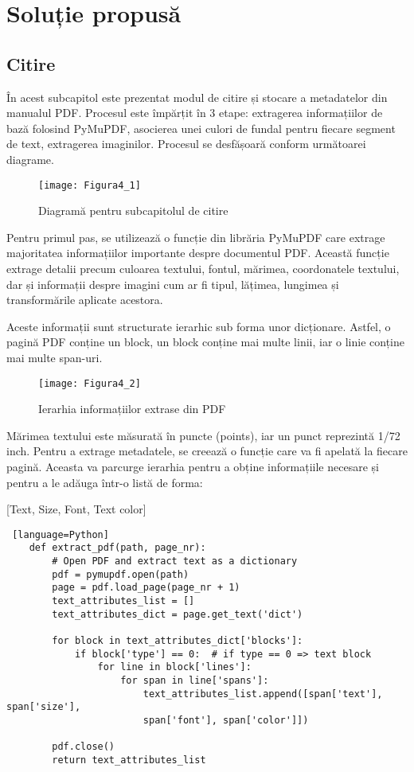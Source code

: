 \chapter{Soluție propusă}
\section{Citire}

În acest subcapitol este prezentat modul de citire și stocare a metadatelor din manualul PDF. Procesul este împărțit în 3 etape: extragerea informațiilor de bază folosind PyMuPDF, asocierea unei culori de fundal pentru fiecare segment de text, extragerea imaginilor. Procesul se desfășoară conform următoarei diagrame.
\begin{figure}[H]
	\centering
	\texttt{[image: Figura4\_1]}
	\caption{Diagramă pentru subcapitolul de citire}
	\label{fig:Figura4_1}
\end{figure}

Pentru primul pas, se utilizează o funcție din librăria PyMuPDF care extrage majoritatea informațiilor importante despre documentul PDF. Această funcție extrage detalii precum culoarea textului, fontul, mărimea, coordonatele textului, dar și informații despre imagini cum ar fi tipul, lățimea, lungimea și transformările aplicate acestora.

Aceste informații sunt structurate ierarhic sub forma unor dicționare. Astfel, o pagină PDF conține un block, un block conține mai multe linii, iar o linie conține mai multe span-uri.
\begin{figure}[H]
	\centering
	\texttt{[image: Figura4\_2]}
	\caption{Ierarhia informațiilor extrase din PDF}
	\label{fig:Figura4_2}
\end{figure}

Mărimea textului este măsurată în puncte (points), iar un punct reprezintă 1/72 inch. Pentru a extrage metadatele, se creează o funcție care va fi apelată la fiecare pagină. Aceasta va parcurge ierarhia pentru a obține informațiile necesare și pentru a le adăuga într-o listă de forma:
\begin{center}
	[Text, Size, Font, Text color]
\end{center}

\begin{lstlisting} [language=Python]
	def extract_pdf(path, page_nr):
		# Open PDF and extract text as a dictionary
		pdf = pymupdf.open(path)
		page = pdf.load_page(page_nr + 1)
		text_attributes_list = []
		text_attributes_dict = page.get_text('dict')
		
		for block in text_attributes_dict['blocks']:
			if block['type'] == 0:  # if type == 0 => text block
				for line in block['lines']:
					for span in line['spans']:
						text_attributes_list.append([span['text'], span['size'], 
						span['font'], span['color']])
			
		pdf.close()
		return text_attributes_list
\end{lstlisting}


